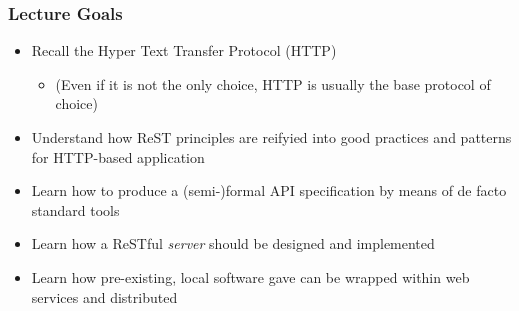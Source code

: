 \documentclass[presentation]{beamer}\mode<presentation>{\usetheme{AMSBolognaFC}}
\begin{document}
\begin{frame}%
\frametitle{Lecture Goals}
    \begin{itemize}
        \item Recall the Hyper Text Transfer Protocol (HTTP)
        \begin{itemize}
            \item (Even if it is not the only choice, HTTP is usually the base protocol of choice)
        \end{itemize}

        \vfill

        \item Understand how ReST principles are reifyied into good practices and patterns for HTTP-based application

        \vfill

        \item Learn how to produce a (semi-)formal \alert{API specification} by means of de facto standard tools

        \vfill

        \item Learn how a ReSTful \emph{server} should be designed and implemented

        \vfill

        \item Learn how pre-existing, local software gave can be \alert{wrapped} within web services and \alert{distributed}
    \end{itemize}
\end{frame}



        

\end{document}
